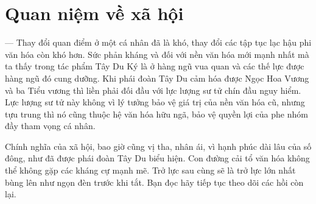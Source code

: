 \section{Quan niệm về xã hội} %
\label{sec:88_89_90_xa_hoi}

--- Thay đổi quan điểm ở một cá nhân đã là khó, thay đổi các tập tục lạc hậu phi văn hóa còn khó hơn. Sức phản kháng và đối với nền văn hóa mới mạnh nhất mà ta thấy trong tác phẩm Tây Du Ký là ở hàng ngũ vua quan và các thế lực được hàng ngũ đó cung dưỡng. Khi phái đoàn Tây Du cảm hóa được Ngọc Hoa Vương và ba Tiểu vương thì liền phải đối đầu với lực lượng sư tử chín đầu nguy hiểm. Lực lượng sư tử này không vì lý tưởng bảo vệ giá trị của nền văn hóa cũ, nhưng tựu trung thì nó cũng thuộc hệ văn hóa hữu ngã, bảo vệ quyền lợi của phe nhóm đầy tham vọng cá nhân.

Chính nghĩa của xã hội, bao giờ cũng vị tha, nhân ái, vì hạnh phúc dài lâu của số đông, như đã được phái đoàn Tây Du biểu hiện. Con đường cải tổ văn hóa không thể không gặp các kháng cự mạnh mẽ. Trở lực sau cùng sẽ là trở lực lớn nhất bùng lên như ngọn đèn trước khi tắt. Bạn đọc hãy tiếp tục theo dõi các hồi còn lại.
